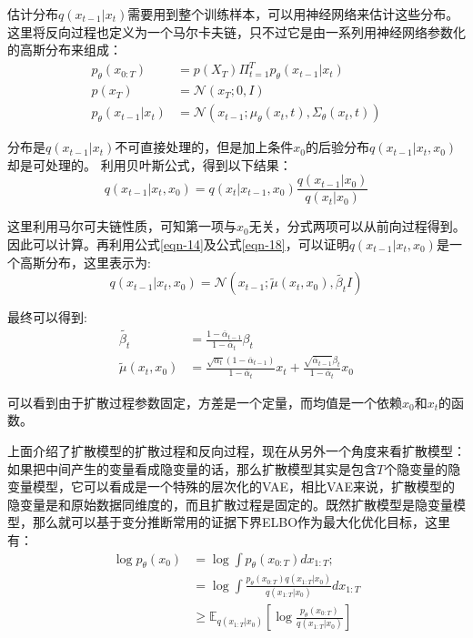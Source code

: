 估计分布$q(x_{t-1}|x_t)$需要用到整个训练样本，可以用神经网络来估计这些分布。这里将反向过程也定义为一个马尔卡夫链，只不过它是由一系列用神经网络参数化的高斯分布来组成：
\begin{align}
      p_{\theta}(x_{0:T}) &= p(X_T)\Pi^T_{t=1}{p_{\theta}(x_{t-1}|x_t)} \label{eqn-15}\\
      p(x_T) &= \mathcal{N}(x_T;0,I)\label{eqn-16}\\
      p_{\theta}(x_{t-1}|x_t) &= \mathcal{N}(x_{t-1};\mu_{\theta}(x_t,t),\Sigma_{\theta}(x_t,t))\label{eqn-17}
\end{align}
\par
分布是$q(x_{t-1}|x_t)$不可直接处理的，但是加上条件$x_0$的后验分布$q(x_{t-1}|x_t,x_0)$却是可处理的。
利用贝叶斯公式，得到以下结果：
\begin{equation}\label{eqn-18}
      q(x_{t-1}|x_t,x_0) = q(x_{t}|x_{t-1},x_0)\frac{q(x_{t-1}|x_0)}{q(x_{t}|x_0)}
\end{equation}
\par
这里利用马尔可夫链性质，可知第一项与$x_0$无关，分式两项可以从前向过程得到。因此可以计算。再利用公式\eqref{eqn-14}及公式\eqref{eqn-18}，可以证明$q(x_{t-1}|x_t,x_0)$是一个高斯分布，这里表示为:
\begin{equation}\label{eqn-19}
      q(x_{t-1}|x_t,x_0) = \mathcal{N}(x_{t-1};\widetilde{\mu}(x_t,x_0),\widetilde{\beta_t}I)
\end{equation}
\par
最终可以得到:
\begin{align}
      \widetilde{\beta_t} &= \frac{1 - \overline{\alpha}_{t-1}}{1 - \overline{\alpha}_{t}}\beta_t \label{eqn-20}\\
      \widetilde{\mu}(x_t,x_0) &= \frac{\sqrt{\alpha_t}(1- \overline{\alpha}_{t-1})}{1- \overline{\alpha}_{t}}x_t + \frac{\sqrt{\overline{\alpha}_{t-1}}\beta_t}{1- \overline{\alpha}_{t}}x_0 \label{eqn-21}
\end{align}
\par
可以看到由于扩散过程参数固定，方差是一个定量，而均值是一个依赖$x_0$和$x_t$的函数。
\par
上面介绍了扩散模型的扩散过程和反向过程，现在从另外一个角度来看扩散模型：如果把中间产生的变量看成隐变量的话，那么扩散模型其实是包含$T$个隐变量的隐变量模型，它可以看成是一个特殊的层次化的VAE，相比VAE来说，扩散模型的隐变量是和原始数据同维度的，而且扩散过程是固定的。既然扩散模型是隐变量模型，那么就可以基于变分推断常用的证据下界ELBO作为最大化优化目标，这里有：
\begin{align}
      \log{p_{\theta}(x_0)} &= \log{\int{p_{\theta}(x_{0:T})dx_{1:T}}};\nonumber\\
      &=\log{\int{\frac{p_{\theta}(x_{0:T})q(x_{1:T}|x_0)}{q(x_{1:T}|x_0)}dx_{1:T}}} \nonumber\\
      &\ge \mathbb{E}_{q(x_{1:T}|x_0)}[\log{\frac{p_{\theta}(x_{0:T})}{q(x_{1:T}|x_0)}}]\nonumber
\end{align}
